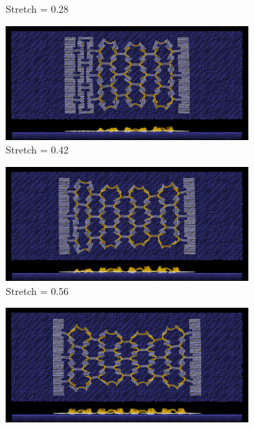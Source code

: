 \begin{figure}[H]
\begin{subfigure}[b]{0.49\textwidth}
        \caption{Stretch = 0.28}
        \label{fig:}
    \end{subfigure}
    \hfill
    \begin{subfigure}[b]{0.49\textwidth}
        \centering
        \includegraphics[width=\textwidth]{figures/baseline/contact_vs_stretch/honeycomb/hon_stretch0042.png}
        \caption{Stretch = 0.42}
        \label{fig:}
    \end{subfigure}
    \hfill
    \begin{subfigure}[b]{0.49\textwidth}
        \centering
        \includegraphics[width=\textwidth]{figures/baseline/contact_vs_stretch/honeycomb/hon_stretch0056.png}
        \caption{Stretch = 0.56}
        \label{fig:}
    \end{subfigure}
    \hfill
    \begin{subfigure}[b]{0.49\textwidth}
        \centering
        \includegraphics[width=\textwidth]{figures/baseline/contact_vs_stretch/honeycomb/hon_stretch0070.png}

\end{subfigure}
\end{figure}
